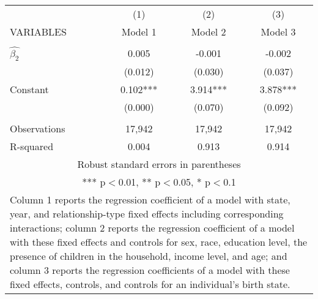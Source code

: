 \begin{tabular}{lccc}
\hline
 & (1) & (2) & (3) \\
VARIABLES & Model 1 & Model 2 & Model 3 \\ \hline
 &  &  &  \\
$\hat{\beta_2}$ & 0.005 & -0.001 & -0.002 \\
 & (0.012) & (0.030) & (0.037) \\
Constant & 0.102*** & 3.914*** & 3.878*** \\
 & (0.000) & (0.070) & (0.092) \\
 &  &  &  \\
Observations & 17,942 & 17,942 & 17,942 \\
 R-squared & 0.004 & 0.913 & 0.914 \\ \hline
\multicolumn{4}{c}{ Robust standard errors in parentheses} \\
\multicolumn{4}{c}{ *** p$<$0.01, ** p$<$0.05, * p$<$0.1} \\
\multicolumn{4}{p{0.6\linewidth}}{\footnotesize Column 1 reports the regression coefficient of a model with state, year, and relationship-type fixed effects including corresponding interactions; column 2 reports the regression coefficient of a model with these fixed effects and controls for sex, race, education level, the presence of children in the household, income level, and age; and column 3 reports the regression coefficients of a model with these fixed effects, controls, and controls for an individual’s birth state.} \\
\end{tabular}
